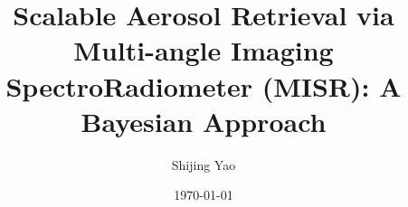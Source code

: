 \documentclass[dvips,12pt]{article}
\begin{document}
\title{Scalable Aerosol Retrieval via Multi-angle Imaging SpectroRadiometer (MISR): A Bayesian Approach}
\author{Shijing Yao}
\date{\today}

\maketitle

















 
 


\end{document}
